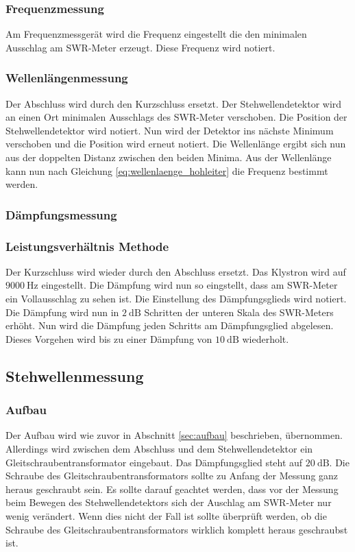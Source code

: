 \subsubsection{Frequenzmessung}
Am Frequenzmessgerät wird die Frequenz eingestellt die den minimalen Ausschlag am SWR-Meter erzeugt.
Diese Frequenz wird notiert.

\subsubsection{Wellenlängenmessung}
Der Abschluss wird durch den Kurzschluss ersetzt.
Der Stehwellendetektor wird an einen Ort minimalen Ausschlags des SWR-Meter verschoben.
Die Position der Stehwellendetektor wird notiert.
Nun wird der Detektor ins nächste Minimum verschoben und die Position wird erneut notiert.
Die Wellenlänge ergibt sich nun aus der doppelten Distanz zwischen den beiden Minima.
Aus der Wellenlänge kann nun nach Gleichung \ref{eq:wellenlaenge_hohleiter} die Frequenz bestimmt werden.

\subsubsection{Dämpfungsmessung}
\subsubsection{Leistungsverhältnis Methode}
Der Kurzschluss wird wieder durch den Abschluss ersetzt.
Das Klystron wird auf $\SI{9000}{\Hz}$ eingestellt.
Die Dämpfung wird nun so eingstellt, dass am SWR-Meter ein Vollausschlag zu sehen ist.
Die Einstellung des Dämpfungsglieds wird notiert.
Die Dämpfung wird nun in $\SI{2}{\dB}$ Schritten der unteren Skala des SWR-Meters erhöht.
Nun wird die Dämpfung jeden Schritts am Dämpfungsglied abgelesen.
Dieses Vorgehen wird bis zu einer Dämpfung von $\SI{10}{\dB}$ wiederholt.

\subsection{Stehwellenmessung}
\subsubsection{Aufbau}
Der Aufbau wird wie zuvor in Abschnitt \ref{sec:aufbau} beschrieben, übernommen.
Allerdings wird zwischen dem Abschluss und dem Stehwellendetektor ein Gleitschraubentransformator eingebaut.
Das Dämpfungsglied steht auf $\SI{20}{\dB}$.
Die Schraube des Gleitschraubentransformators sollte zu Anfang der Messung ganz heraus geschraubt sein.
Es sollte darauf geachtet werden, dass vor der Messung beim Bewegen des Stehwellendetektors sich der Auschlag am SWR-Meter nur wenig verändert.
Wenn dies nicht der Fall ist sollte überprüft werden, ob die Schraube des Gleitschraubentransformators wirklich komplett heraus geschraubst ist.

